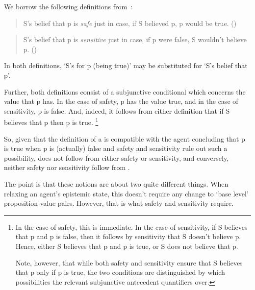 \begin{note}
  We borrow the following definitions from~\citeauthor{Zalabardo:2017td}:

  \begin{quote}
    S's belief that p is \emph{safe} just in case, if S believed p, p would be true.\newline
    \mbox{}\hfill\mbox{(\citeyear[1]{Zalabardo:2017td})}
  \end{quote}

  \begin{quote}
    S's belief that p is \emph{sensitive} just in case, if p were false, S wouldn't believe p.\nolinebreak
    \mbox{}\hfill\mbox{(\citeyear[2]{Zalabardo:2017td})}
  \end{quote}

  In both definitions, `S's \support{} for p (being true)' may be substituted for `S's belief that p'.

  Further, both definitions consist of a subjunctive conditional which concerns the value that p has.
  In the case of safety, p has the value true, and in the case of sensitivity, p is false.
  And, indeed, it follows from either definition that if S believes that p then p is true.\nolinebreak
  \footnote{
    In the case of safety, this is immediate.
    In the case of sensitivity, if S believes that p and p is false, then it follows by sensitivity that S doesn't believe p.
    Hence, either S believes that p and p is true, or S does not believe that p.

    Note, however, that while both safety and sensitivity ensure that S believes that p only if p is true, the two conditions are distinguished by which possibilities the relevant subjunctive antecedent quantifiers over.
  }

  So, given that the definition of a \sink{} is compatible with the agent concluding that p is true when p is (actually) false and safety and sensitivity rule out such a possibility, \ideaS{} does not follow from either safety or sensitivity, and conversely, neither safety nor sensitivity follow from \ideaS{}.
\end{note}

\begin{note}
  \color{red} The point is that these notions are about two quite different things.
  When relaxing an agent's epistemic state, this doesn't require any change to `base level' proposition-value pairs.
  However, that is what safety and sensitivity require.
\end{note}


